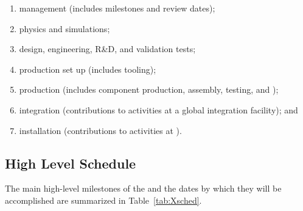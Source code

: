 \begin{enumerate}
\item management   (includes milestones and review dates);
\item physics and simulations;
\item design, engineering, R\&D, and validation tests;
\item production set up (includes tooling);
\item production (includes component production, assembly, testing, and );
\item integration (contributions to activities at a global integration facility); and
\item installation (contributions to activities at ).

\end{enumerate}

\subsection{High Level Schedule}


The main high-level milestones of the    and the dates by which they will be accomplished are summarized in Table~\ref{tab:Xsched}.

